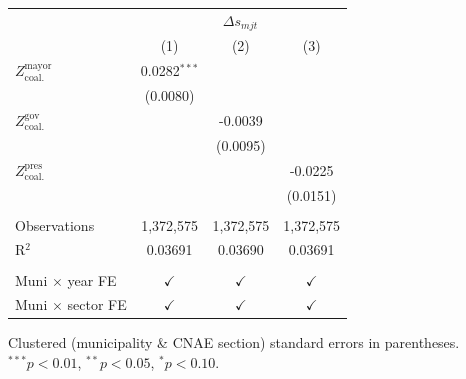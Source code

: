 \begingroup
\centering
\begin{tabular}{lccc}
   \toprule
    & \multicolumn{3}{c}{$\Delta s_{mjt}$}\\
                                       & (1)            & (2)           & (3)\\  
   \midrule 
   $Z^{\text{mayor}}_{\text{coal.}}$   & 0.0282$^{***}$ &               &   \\   
                                       & (0.0080)       &               &   \\   
   $Z^{\text{gov}}_{\text{coal.}}$     &                & -0.0039       &   \\   
                                       &                & (0.0095)      &   \\   
   $Z^{\text{pres}}_{\text{coal.}}$    &                &               & -0.0225\\   
                                       &                &               & (0.0151)\\   
    \\
   Observations                        & 1,372,575      & 1,372,575     & 1,372,575\\  
   R$^2$                               & 0.03691        & 0.03690       & 0.03691\\  
    \\
   Muni $\times$ year FE               & $\checkmark$   & $\checkmark$  & $\checkmark$\\   
   Muni $\times$ sector FE             & $\checkmark$   & $\checkmark$  & $\checkmark$\\   
   \bottomrule
\end{tabular}
 
\par \raggedright 
Clustered (municipality \& CNAE section) standard errors in parentheses. $^{***}p<0.01$, $^{**}p<0.05$, $^{*}p<0.10$.
\par\endgroup
